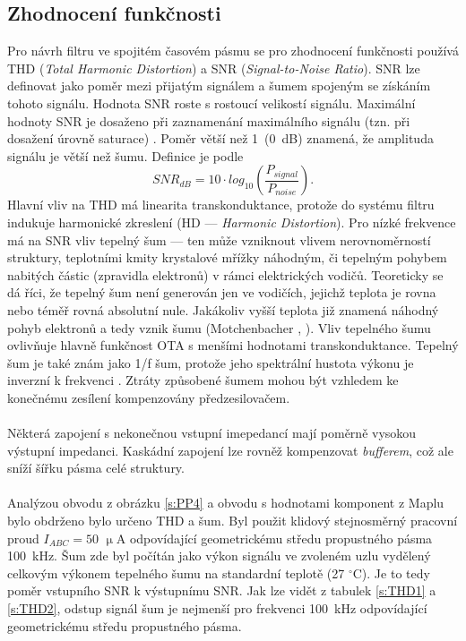 \subsection{Zhodnocení funkčnosti}
\noindent Pro návrh filtru ve spojitém časovém  pásmu se pro zhodnocení funkčnosti používá THD (\textit{Total Harmonic Distortion}) a SNR (\textit{Signal-to-Noise Ratio}). SNR lze definovat jako poměr mezi přijatým signálem a šumem spojeným se získáním tohoto signálu. Hodnota SNR roste s rostoucí velikostí signálu. Maximální hodnoty SNR je dosaženo při zaznamenání maximálního signálu (tzn. při dosažení úrovně saturace) \cite{21}. Poměr větší než 1~(0~dB) znamená, že amplituda signálu je větší než šumu. Definice je podle \cite{22}
\begin{equation}
SNR_{dB} = 10 \cdot log_{10}\left(\frac{P_{signal}}{P_{noise}}\right).
\end{equation}
 Hlavní vliv na THD má linearita transkonduktance, protože do systému filtru indukuje harmonické zkreslení (HD --- \textit{Harmonic Distortion}). Pro nízké frekvence má na SNR vliv tepelný šum --- ten může vzniknout vlivem nerovnoměrností struktury, teplotními kmity krystalové mřížky náhodným, či tepelným pohybem nabitých částic (zpravidla elektronů) v rámci elektrických vodičů. Teoreticky se dá říci, že tepelný šum není generován jen ve vodičích, jejichž teplota je rovna nebo téměř rovná absolutní nule. Jakákoliv vyšší teplota již znamená náhodný pohyb elektronů a tedy vznik šumu (Motchenbacher \cite{23}, \cite{24}). Vliv tepelného šumu ovlivňuje hlavně funkčnost OTA s menšími hodnotami transkonduktance. Tepelný šum je také znám jako 1/f šum, protože jeho spektrální hustota výkonu je inverzní k frekvenci \cite{1}. Ztráty způsobené šumem mohou být vzhledem ke konečnému zesílení kompenzovány předzesilovačem. \\
\\
Některá zapojení s nekonečnou vstupní imepedancí mají poměrně vysokou výstupní impedanci. Kaskádní zapojení lze rovněž kompenzovat \textit{bufferem}, což ale sníží šířku pásma celé struktury.\\
\\
Analýzou obvodu z obrázku \ref{s:PP4} a obvodu s hodnotami komponent z Maplu bylo obdrženo bylo určeno THD a šum. Byl použit klidový stejnosměrný pracovní proud $I_{ABC} = 50$ $\upmu$A odpovídající geometrickému středu propustného pásma 100~kHz. Šum zde byl počítán jako výkon signálu ve zvoleném uzlu vydělený celkovým výkonem tepelného šumu na standardní teplotě (27 $^{\circ}$C). Je to tedy poměr vstupního SNR k výstupnímu SNR. Jak lze vidět z tabulek \ref{s:THD1} a \ref{s:THD2}, odstup signál šum je nejmenší pro frekvenci 100~kHz odpovídající geometrickému středu propustného pásma.
